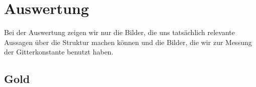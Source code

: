 \section{Auswertung}

Bei der Auswertung zeigen wir nur die Bilder, die uns tatsächlich relevante Aussagen über die Struktur machen können und die Bilder, die wir zur Messung der Gitterkonstante benutzt haben.

\subsection{Gold}

